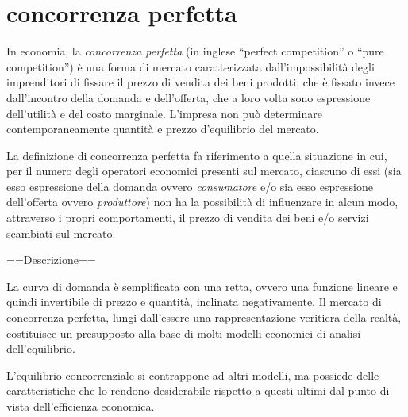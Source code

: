 

\section{concorrenza perfetta}


In economia, la \emph{concorrenza perfetta} (in inglese 
``perfect competition'' o ``pure competition'') è una forma di mercato
caratterizzata dall'impossibilità degli imprenditori di 
fissare il prezzo di vendita dei beni prodotti,  che è fissato invece 
dall'incontro della domanda e dell'offerta, che a loro volta sono espressione 
dell'utilità e del costo marginale. 
L'impresa non può determinare contemporaneamente quantità e prezzo d'equilibrio 
del mercato.

La definizione di concorrenza perfetta fa riferimento a quella situazione in 
cui, per il numero degli operatori economici presenti sul mercato, ciascuno di 
essi (sia esso espressione della domanda ovvero \emph{consumatore} e/o sia 
esso espressione dell'offerta ovvero \emph{produttore}) non ha la possibilità 
di influenzare in alcun modo, attraverso i propri comportamenti, il prezzo di 
vendita dei beni e/o servizi scambiati sul mercato.

==Descrizione==

La curva di domanda è semplificata con una retta, ovvero una funzione 
lineare e quindi invertibile di prezzo e quantità, inclinata negativamente.
Il mercato di concorrenza perfetta, lungi dall'essere una rappresentazione 
veritiera della realtà, costituisce un presupposto alla base di molti modelli 
economici di analisi dell'equilibrio.

L'equilibrio concorrenziale si contrappone ad altri modelli, ma possiede delle 
caratteristiche che lo rendono desiderabile rispetto a questi ultimi dal punto 
di vista dell'efficienza economica.

